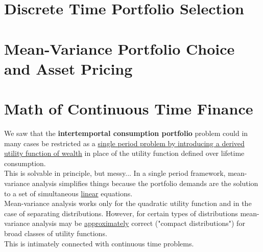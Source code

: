 \documentclass[
14pt,notheorems,hyperref={pdfauthor=whatever}
]{beamer}
\begin{document}
\section{Discrete Time Portfolio Selection}




\section{Mean-Variance Portfolio Choice and Asset Pricing}


\section{Math of Continuous Time Finance}

\begin{frame}
We saw that the \textbf{intertemportal consumption portfolio} problem could in many cases be restricted as a \underline{single period problem by introducing a derived utility function of wealth} in place of the utility function defined over lifetime consumption.\\
\hfill\break
This is solvable in principle, but messy... In a single period framework, mean-variance analysis simplifies things because the portfolio demands are the solution to a set of simultaneous \underline{linear} equations.\\
\hfill\break
Mean-variance analysis works only for the quadratic utility function and in the case of separating distributions. However, for certain types of distributions mean-variance analysis may be \underline{approximately} correct ("compact distributions") for broad classes of utility functions.\\
\hfill\break
This is intimately connected with continuous time problems.
\end{frame}
\end{document}
